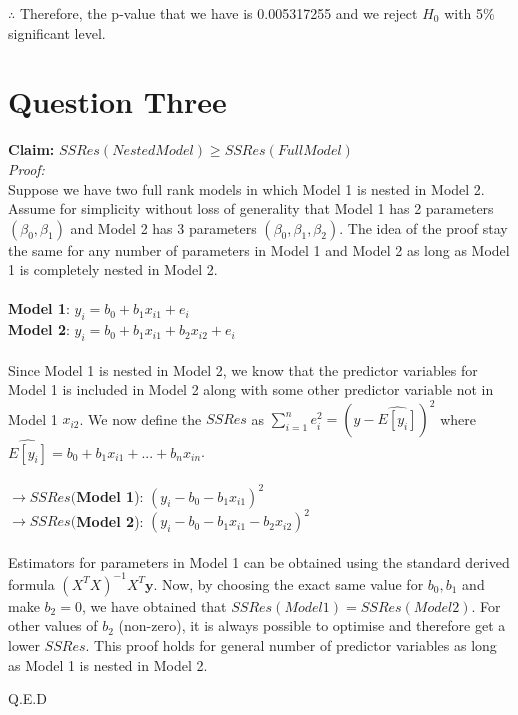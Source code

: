 \documentclass{article}
\begin{document}
\noindent $\therefore$ Therefore, the p-value that we have is 0.005317255 and we reject $H_0$ with 5\% significant level.

\section {Question Three}
\textbf{Claim:} $SSRes(Nested Model) \geq SSRes(Full Model)$ \\

\noindent \textit{Proof:} \\
Suppose we have two full rank models in which Model 1 is nested in Model 2. Assume for simplicity without loss of generality that Model 1 has 2 parameters $(\beta_0, \beta_1)$ and Model 2 has 3 parameters $(\beta_0, \beta_1, \beta_2)$. The idea of the proof stay the same for any number of parameters in Model 1 and Model 2 as long as Model 1 is completely nested in Model 2. \\ \\
\textbf{Model 1}: $y_i = b_0 + b_1 x_{i1} + e_i$ \\
\textbf{Model 2}: $y_i = b_0 + b_1 x_{i1} + b_2 x_{i2} + e_i$ \\ \\
Since Model 1 is nested in Model 2, we know that the predictor variables for Model 1 is included in Model 2 along with some other predictor variable not in Model 1 $x_{i2}$. We now define the $SSRes$ as $\sum_{i=1}^n e_i^2 = (y - \widehat{E[y_i]})^2$ where $\widehat{E[y_i]} = b_0 + b_1 x_{i1} + ... +b_n x_{in}$.\\ \\
$\rightarrow SSRes($\textbf{Model 1}): $(y_i - b_0 - b_1 x_{i1})^2 $\\
$\rightarrow SSRes($\textbf{Model 2}): $(y_i - b_0 - b_1 x_{i1} - b_2 x_{i2})^2 $ \\ \\
Estimators for parameters in Model 1 can be obtained using the standard derived formula $(X^TX)^{-1}X^T\textbf{y}$. Now, by choosing the exact same value for $b_0, b_1$ and make $b_2 = 0$, we have obtained that $SSRes(Model1) = SSRes(Model2)$. For other values of $b_2$ (non-zero), it is always possible to optimise and therefore get a lower $SSRes$. This proof holds for general number of predictor variables as long as Model 1 is nested in Model 2.

\begin{flushright}
Q.E.D
\end{flushright}

\end{document}

